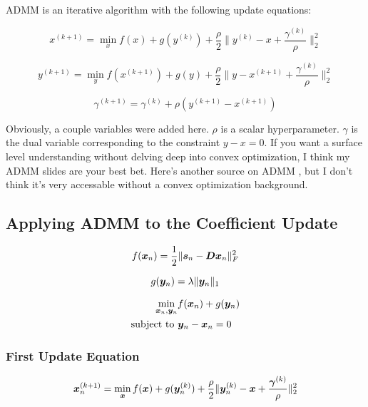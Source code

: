 \documentclass{article}
\begin{document}
ADMM is an iterative algorithm with the following update equations:

\begin{equation}
x^{(k + 1)} = \min_x f(x) + g(y^{(k)}) + \frac{\rho}{2}\|y^{(k)} - x + \frac{\gamma^{(k)}}{\rho}\|_2^2
\end{equation}

\begin{equation}
y^{(k + 1)} = \min_y f(x^{(k + 1)}) + g(y) + \frac{\rho}{2}\|y - x^({k + 1}) + \frac{\gamma^{(k)}}{\rho}\|_2^2
\end{equation}

\begin{equation}
\gamma^{(k + 1)} = \gamma^{(k)} + \rho(y^{(k + 1)} - x^{(k + 1)})
\end{equation}

Obviously, a couple variables were added here. $\rho$ is a scalar hyperparameter. $\gamma$ is the dual variable corresponding to the constraint $y - x = 0$. If you want a surface level understanding without delving deep into convex optimization, I think my ADMM slides are your best bet. Here's another source on ADMM \cite{boyd2011distributed}, but I don't think it's very accessable without a convex optimization background. 

\subsection{Applying ADMM to the Coefficient Update}

\begin{equation}
f(\bm{x}_n) = \frac{1}{2}\|\bm{s}_n - \bm{D}\bm{x}_n\|_F^2
\end{equation}


\begin{equation}
g(\bm{y}_n) = \lambda\|\bm{y}_n\|_1
\end{equation}

\begin{equation}
\begin{aligned}
\min_{\bm{x}_n,\bm{y}_n} & f(\bm{x}_n) + g(\bm{y}_n) \\
\text{subject to } & \bm{y}_n - \bm{x}_n = 0
\end{aligned}
\end{equation}

\subsubsection{First Update Equation}
\begin{equation}
\bm{x}_n^{(k + 1)} = \min_{\bm{x}} f(\bm{x}) + g(\bm{y}_n^{(k)}) + \frac{\rho}{2}\|\bm{y}_n^{(k)} - \bm{x} + \frac{\bm{\gamma}^{(k)}}{\rho}\|_2^2
\end{equation}
\end{document}
